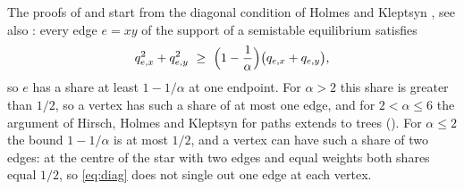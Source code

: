 \documentclass[11pt]{article}
\theoremstyle{definition}
\theoremstyle{remark}
\begin{document}
The proofs of \cite[Theorem~2(a)]{HK} and \cite[Section~4]{Kr} start from the diagonal condition of Holmes and
Kleptsyn \cite[(18)]{HK}, see also \cite[Lemma~3]{HHK}: every edge $e=xy$ of the support of a semistable equilibrium
satisfies
\begin{equation}\label{eq:diag}
  q_{e,x}^2+q_{e,y}^2\ \ge\ \Bigl(1-\frac1\alpha\Bigr)\bigl(q_{e,x}+q_{e,y}\bigr),
\end{equation}
so $e$ has a share at least $1-1/\alpha$ at one endpoint. For $\alpha>2$ this share is greater than $1/2$, so a
vertex has such a share of at most one edge, and for $2<\alpha\le 6$ the argument of Hirsch, Holmes and Kleptsyn for
paths \cite[Proposition~9, Corollary~3 and Lemma~4]{HHK} extends to trees ().
For $\alpha\le 2$ the bound $1-1/\alpha$ is at most $1/2$, and a vertex can have such a share of two edges: at the
centre of the star with two edges and equal weights both shares equal $1/2$, so \eqref{eq:diag} does not single out
one edge at each vertex.
\end{document}

